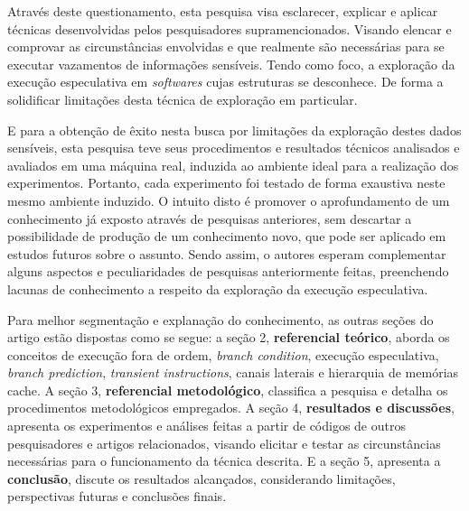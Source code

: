 \documentclass[
	article,			    %
	12pt,				    %
	oneside,			    %
	a4paper,			    %
	chapter=TITLE,		    %
	section=TITLE,		    %
	subsection=TITLE,	    %
	english,			    %
	brazil,				    %
	sumario=tradicional
]{abntex2}
\begin{document}
Através deste questionamento, esta pesquisa visa esclarecer, explicar e aplicar técnicas desenvolvidas pelos pesquisadores supramencionados. Visando elencar e comprovar as circunstâncias envolvidas e que realmente são necessárias para se executar vazamentos de informações sensíveis. Tendo como foco, a exploração da execução especulativa em \emph{softwares} cujas estruturas se desconhece. De forma a solidificar limitações desta técnica de exploração em particular.

E para a obtenção de êxito nesta busca por limitações da exploração destes dados sensíveis, esta pesquisa teve seus procedimentos e resultados técnicos analisados e avaliados em uma máquina real, induzida ao ambiente ideal para a realização dos experimentos. Portanto, cada experimento foi testado de forma exaustiva neste mesmo ambiente induzido. O intuito disto é promover o aprofundamento de um conhecimento já exposto através de pesquisas anteriores, sem descartar a possibilidade de produção de um conhecimento novo, que pode ser aplicado em estudos futuros sobre o assunto. Sendo assim, o autores esperam complementar alguns aspectos e peculiaridades de pesquisas anteriormente feitas, preenchendo lacunas de conhecimento a respeito da exploração da execução especulativa.

Para melhor segmentação e explanação do conhecimento, as outras seções do artigo estão dispostas como se segue: a seção 2, \textbf{referencial teórico}, aborda os conceitos de execução fora de ordem, \emph{branch condition}, execução especulativa, \emph{branch prediction}, \emph{transient instructions}, canais laterais e hierarquia de memórias cache. A seção 3, \textbf{referencial metodológico}, classifica a pesquisa e detalha os procedimentos metodológicos empregados. A seção 4, \textbf{resultados e discussões}, apresenta os experimentos e análises feitas a partir de códigos de outros pesquisadores e artigos relacionados, visando elicitar e testar as circunstâncias necessárias para o funcionamento da técnica descrita. E a seção 5, apresenta a \textbf{conclusão}, discute os resultados alcançados, considerando limitações, perspectivas futuras e conclusões finais.

\end{document}
